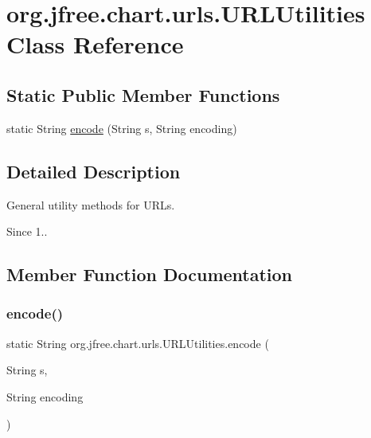 \hypertarget{classorg_1_1jfree_1_1chart_1_1urls_1_1_u_r_l_utilities}{}\section{org.\+jfree.\+chart.\+urls.\+U\+R\+L\+Utilities Class Reference}
\label{classorg_1_1jfree_1_1chart_1_1urls_1_1_u_r_l_utilities}
\subsection*{Static Public Member Functions}
\begin{DoxyCompactItemize}
\item 
static String \mbox{\hyperlink{classorg_1_1jfree_1_1chart_1_1urls_1_1_u_r_l_utilities_ac3c4cc9ffd3aaba98d6848e4e74d1f48}{encode}} (String s, String encoding)
\end{DoxyCompactItemize}


\subsection{Detailed Description}
General utility methods for U\+R\+Ls.

\begin{DoxySince}{Since}
1.. 
\end{DoxySince}


\subsection{Member Function Documentation}
\mbox{\label{classorg_1_1jfree_1_1chart_1_1urls_1_1_u_r_l_utilities_ac3c4cc9ffd3aaba98d6848e4e74d1f48}} 
\subsubsection{\texorpdfstring{encode()}{encode()}}
{\footnotesize\ttfamily static String org.\+jfree.\+chart.\+urls.\+U\+R\+L\+Utilities.\+encode (\begin{DoxyParamCaption}\item[{String}]{s,  }\item[{String}]{encoding }\end{DoxyParamCaption})\hspace{0.3cm}{\ttfamily [static]}}

